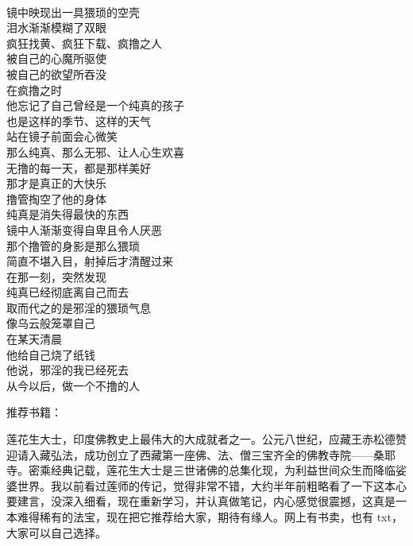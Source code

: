 \begin{poem}[消失的纯真]
    \begin{multicols}{2}
        \begin{center}~\\
            镜中映现出一具猥琐的空壳 \\ 泪水渐渐模糊了双眼 \\ 疯狂找黄、疯狂下载、疯撸之人 \\ 被自己的心魔所驱使 \\ 被自己的欲望所吞没 \\ 在疯撸之时 \\ 他忘记了自己曾经是一个纯真的孩子 \\ 也是这样的季节、这样的天气 \\ 站在镜子前面会心微笑 \\ 那么纯真、那么无邪、让人心生欢喜 \\ 无撸的每一天，都是那样美好 \\ 那才是真正的大快乐 \\ 撸管掏空了他的身体 \\ 纯真是消失得最快的东西 \\ 镜中人渐渐变得自卑且令人厌恶 \\ 那个撸管的身影是那么猥琐 \\ 简直不堪入目，射掉后才清醒过来 \\ 在那一刻，突然发现 \\ 纯真已经彻底离自己而去 \\ 取而代之的是邪淫的猥琐气息 \\ 像乌云般笼罩自己 \\ 在某天清晨 \\ 他给自己烧了纸钱 \\ 他说，邪淫的我已经死去 \\ 从今以后，做一个不撸的人
        \end{center}
    \end{multicols}
\end{poem}

推荐书籍：

\begin{book}
    莲花生大士，印度佛教史上最伟大的大成就者之一。公元八世纪，应藏王赤松德赞迎请入藏弘法，成功创立了西藏第一座佛、法、僧三宝齐全的佛教寺院——桑耶寺。密乘经典记载，莲花生大士是三世诸佛的总集化现，为利益世间众生而降临娑婆世界。我以前看过莲师的传记，觉得非常不错，大约半年前粗略看了一下这本心要建言，没深入细看，现在重新学习，并认真做笔记，内心感觉很震撼，这真是一本难得稀有的法宝，现在把它推荐给大家，期待有缘人。网上有书卖，也有 txt，大家可以自己选择。
\end{book}
